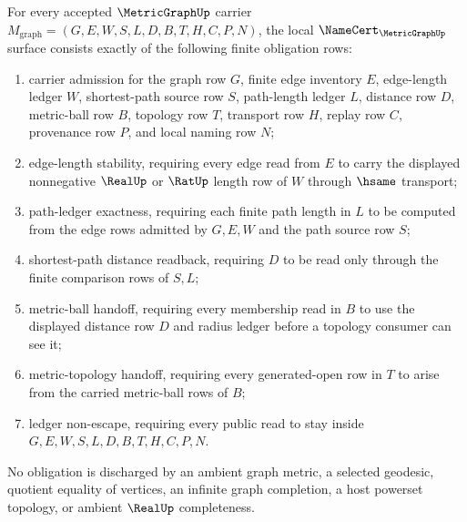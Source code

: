 \begin{theorem}
\label{thm:metric-graph-namecert-obligations}
For every accepted $\MetricGraphUp$ carrier $M_{\mathrm{graph}}=(G,E,W,S,L,D,B,T,H,C,P,N)$, the local $\NameCert_{\MetricGraphUp}$ surface consists exactly of the following finite obligation rows:
\begin{enumerate}
\item carrier admission for the graph row $G$, finite edge inventory $E$, edge-length ledger $W$, shortest-path source row $S$, path-length ledger $L$, distance row $D$, metric-ball row $B$, topology row $T$, transport row $H$, replay row $C$, provenance row $P$, and local naming row $N$;
\item edge-length stability, requiring every edge read from $E$ to carry the displayed nonnegative $\RealUp$ or $\RatUp$ length row of $W$ through $\hsame$ transport;
\item path-ledger exactness, requiring each finite path length in $L$ to be computed from the edge rows admitted by $G,E,W$ and the path source row $S$;
\item shortest-path distance readback, requiring $D$ to be read only through the finite comparison rows of $S,L$;
\item metric-ball handoff, requiring every membership read in $B$ to use the displayed distance row $D$ and radius ledger before a topology consumer can see it;
\item metric-topology handoff, requiring every generated-open row in $T$ to arise from the carried metric-ball rows of $B$;
\item ledger non-escape, requiring every public read to stay inside $G,E,W,S,L,D,B,T,H,C,P,N$.
\end{enumerate}
No obligation is discharged by an ambient graph metric, a selected geodesic, quotient equality of vertices, an infinite graph completion, a host powerset topology, or ambient $\RealUp$ completeness.
\end{theorem}

